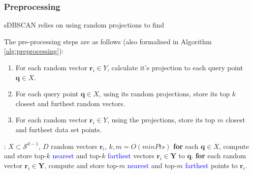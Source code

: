 \documentclass{article}
\newcommand{\br}{\mathbf{r}}
\newcommand{\bq}{\mathbf{q}}
\newcommand{\eps}{\epsilon}
\newcommand{\Bqt}{\widetilde{B}_{\eps}(\bq)}
\newcommand{\Sd} {\mathcal{S}^{d-1}}
\newcommand{\Nqt}{\widetilde{N}(\bq)}
\begin{document}

\subsubsection{Preprocessing}

sDBSCAN relies on using random projections to find 

The pre-processing steps are as follows (also formalised in Algorithm \ref{alg:preprocessing}):

\begin{enumerate}
	\item For each random vector $\br_i \in Y$, calculate it's projection to each query point $\bq \in X$. 
	\item For each query point $\bq \in X$, using its random projections, store its top $k$ closest and furthest random vectors.
	\item For each random vector $\br_i \in Y$, using the projections, store its top $m$ closest and furthest data set points.
\end{enumerate}


\begin{algorithm}[H]
	\caption{Preprocessing}
	\label{alg:preprocessing}	
	\begin{algorithmic} [1]
		: $X \subset \Sd$, $D$ random vectors $\br_i$, $k, m = O(minPts)$		
		\State \textbf{for} each $\bq \in X$, compute and store top-$k$ \textcolor{blue}{nearest} and top-$k$ \textcolor{blue}{farthest} vectors $\br_i \in \mathbf{Y}$ to $\bq$.
		\State \textbf{for} each random vector $\br_i \in \mathbf{Y}$, compute and store top-$m$ \textcolor{blue}{nearest} and top-$m$ \textcolor{blue}{farthest} points to $\br_i$.		
		\normalsize		
	\end{algorithmic}
\end{algorithm}
\end{document}
